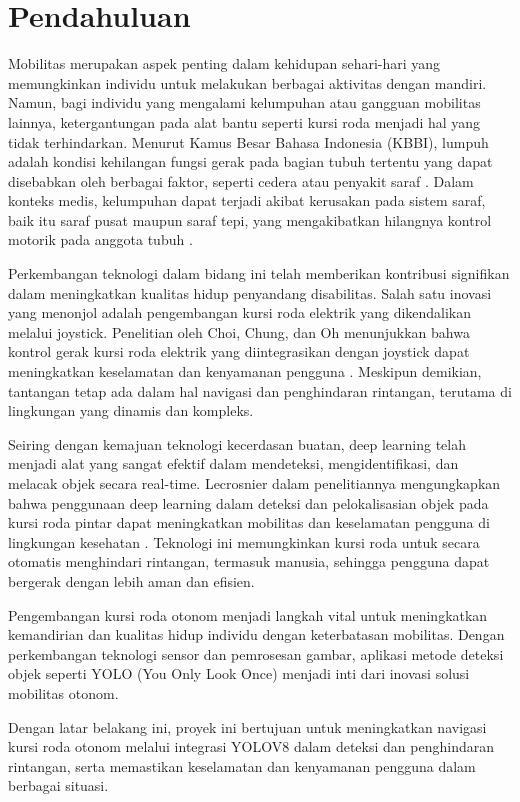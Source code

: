 \section{Pendahuluan}
\label{sec:pendahuluan}

Mobilitas merupakan aspek penting dalam kehidupan sehari-hari yang memungkinkan individu untuk melakukan berbagai aktivitas dengan mandiri. Namun, bagi individu yang mengalami kelumpuhan atau gangguan mobilitas lainnya, ketergantungan pada alat bantu seperti kursi roda menjadi hal yang tidak terhindarkan. Menurut Kamus Besar Bahasa Indonesia (KBBI), lumpuh adalah kondisi kehilangan fungsi gerak pada bagian tubuh tertentu yang dapat disebabkan oleh berbagai faktor, seperti cedera atau penyakit saraf \cite{Daring_2016}. Dalam konteks medis, kelumpuhan dapat terjadi akibat kerusakan pada sistem saraf, baik itu saraf pusat maupun saraf tepi, yang mengakibatkan hilangnya kontrol motorik pada anggota tubuh \cite{Pansawira_2022}.

Perkembangan teknologi dalam bidang ini telah memberikan kontribusi signifikan dalam meningkatkan kualitas hidup penyandang disabilitas. Salah satu inovasi yang menonjol adalah pengembangan kursi roda elektrik yang dikendalikan melalui joystick. Penelitian oleh Choi, Chung, dan Oh menunjukkan bahwa kontrol gerak kursi roda elektrik yang diintegrasikan dengan joystick dapat meningkatkan keselamatan dan kenyamanan pengguna \cite{choi2019motion}. Meskipun demikian, tantangan tetap ada dalam hal navigasi dan penghindaran rintangan, terutama di lingkungan yang dinamis dan kompleks.

Seiring dengan kemajuan teknologi kecerdasan buatan, deep learning telah menjadi alat yang sangat efektif dalam mendeteksi, mengidentifikasi, dan melacak objek secara real-time. Lecrosnier dalam penelitiannya mengungkapkan bahwa penggunaan deep learning dalam deteksi dan pelokalisasian objek pada kursi roda pintar dapat meningkatkan mobilitas dan keselamatan pengguna di lingkungan kesehatan \cite{lecrosnier2021deep}. Teknologi ini memungkinkan kursi roda untuk secara otomatis menghindari rintangan, termasuk manusia, sehingga pengguna dapat bergerak dengan lebih aman dan efisien.

Pengembangan kursi roda otonom menjadi langkah vital untuk meningkatkan kemandirian dan kualitas hidup individu dengan keterbatasan mobilitas. Dengan perkembangan teknologi sensor dan pemrosesan gambar, aplikasi metode deteksi objek seperti YOLO (You Only Look Once) menjadi inti dari inovasi solusi mobilitas otonom.

Dengan latar belakang ini, proyek ini bertujuan untuk meningkatkan navigasi kursi roda otonom melalui integrasi YOLOV8 dalam deteksi dan penghindaran rintangan, serta memastikan keselamatan dan kenyamanan pengguna dalam berbagai situasi.
